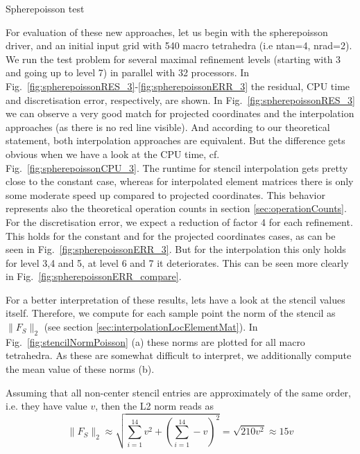\documentclass[a4paper,11pt,reqno]{amsart}
\numberwithin{figure}{section}
\numberwithin{table}{section}
\begin{document}
\clearpage
\begin{section}{Spherepoisson test}



For evaluation of these new approaches, let us begin with the spherepoisson driver, 
and an initial input grid with 
540 macro tetrahedra (i.e ntan=4, nrad=2). We run the test problem for several
maximal refinement levels (starting with 3 and going up to level 7) in parallel
with 32 processors. In Fig.~\ref{fig:spherepoissonRES_3}-\ref{fig:spherepoissonERR_3}
the residual, CPU time and discretisation error, respectively, are shown.
In Fig.~\ref{fig:spherepoissonRES_3} we can observe a very good match for
projected coordinates and the interpolation
approaches (as there is no red line visible).
And according to our theoretical statement, both interpolation approaches are
equivalent. But the difference gets obvious when we have a look at the CPU time,
cf. Fig.~\ref{fig:spherepoissonCPU_3}. The runtime for stencil interpolation
gets pretty close to the constant case, whereas for interpolated element matrices
there is only some moderate speed up compared to projected coordinates.
This behavior represents also the theoretical operation counts in section 
\ref{sec:operationCounts}.
For the discretisation error, we expect a reduction
of factor 4 for each refinement. This holds for the constant and for the projected
coordinates cases, as can be seen in Fig.~\ref{fig:spherepoissonERR_3}. But for
the interpolation this only holds for level 3,4 and 5, at level 6 and 7 it deteriorates.
This can be seen more clearly in Fig.~\ref{fig:spherepoissonERR_compare}.

For a better interpretation of these results, lets have a look at the stencil values itself.
Therefore, we compute for each sample point the norm of the stencil as $\|F_S\|_2$ 
(see section \ref{sec:interpolationLocElementMat}).
In Fig.~\ref{fig:stencilNormPoisson} (a) these norms are plotted for all macro tetrahedra.
As these are somewhat difficult to interpret, we additionally compute the mean value
of these norms (b). 

Assuming that all non-center stencil entries are approximately of the same order,
i.e. they have value $v$, then the L2 norm reads as
\begin{equation}
\|F_S\|_2 \approx \sqrt{\sum_{i=1}^{14}v^2 + \left(\sum_{i=1}^{14}-v\right)^2}
= \sqrt{210 v^2} \approx 15v
\end{equation}




\end{section}
\end{document}
